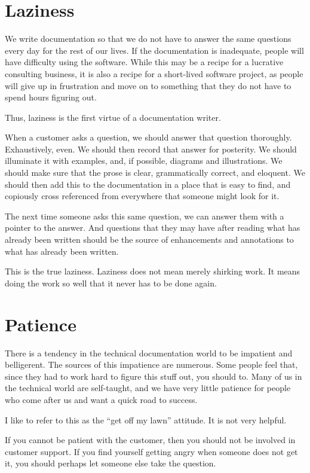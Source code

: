 \section*{Laziness}

We write documentation so that we do not have to answer the same questions every day for the rest of our lives. If the documentation is inadequate, people will have difficulty using the software. While this may be a recipe for a lucrative consulting business, it is also a recipe for a short-lived software project, as people will give up in frustration and move on to something that they do not have to spend hours figuring out.

Thus, laziness is the first virtue of a documentation writer.

When a customer asks a question, we should answer that question thoroughly. Exhaustively, even. We should then record that answer for posterity. We should illuminate it with examples, and, if possible, diagrams and illustrations. We should make sure that the prose is clear, grammatically correct, and eloquent. We should then add this to the documentation in a place that is easy to find, and copiously cross referenced from everywhere that someone might look for it.

The next time someone asks this same question, we can answer them with a pointer to the answer. And questions that they may have after reading what has already been written should be the source of enhancements and annotations to what has already been written.

This is the true laziness. Laziness does not mean merely shirking work. It means doing the work so well that it never has to be done again.

\section*{Patience}
There is a tendency in the technical documentation world to be impatient and belligerent. The sources of this impatience are numerous. Some people feel that, since they had to work hard to figure this stuff out, you should to. Many of us in the technical world are self-taught, and we have very little patience for people who come after us and want a quick road to success.

I like to refer to this as the ``get off my lawn'' attitude. It is not very helpful.

If you cannot be patient with the customer, then you should not be involved in customer support. If you find yourself getting angry when someone does not get it, you should perhaps let someone else take the question.

